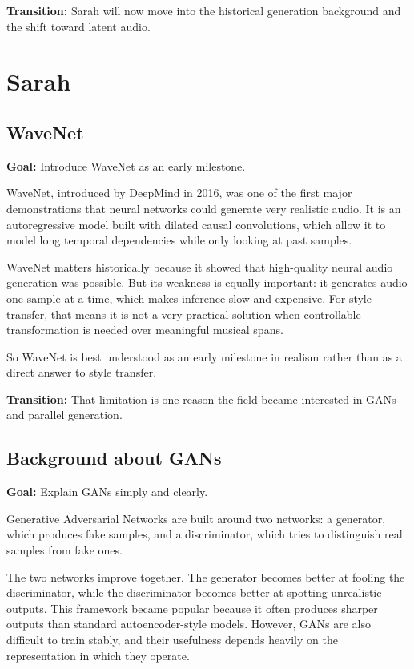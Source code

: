 \documentclass[11pt]{article}
\begin{document}
\textbf{Transition:} Sarah will now move into the historical generation background and the shift toward latent audio.

\newpage
\section{Sarah}

\subsection*{WaveNet}
\textbf{Goal:} Introduce WaveNet as an early milestone.

WaveNet, introduced by DeepMind in 2016, was one of the first major demonstrations that neural networks could generate very realistic audio. It is an autoregressive model built with dilated causal convolutions, which allow it to model long temporal dependencies while only looking at past samples.

WaveNet matters historically because it showed that high-quality neural audio generation was possible. But its weakness is equally important: it generates audio one sample at a time, which makes inference slow and expensive. For style transfer, that means it is not a very practical solution when controllable transformation is needed over meaningful musical spans.

So WaveNet is best understood as an early milestone in realism rather than as a direct answer to style transfer.

\textbf{Transition:} That limitation is one reason the field became interested in GANs and parallel generation.

\subsection*{Background about GANs}
\textbf{Goal:} Explain GANs simply and clearly.

Generative Adversarial Networks are built around two networks: a generator, which produces fake samples, and a discriminator, which tries to distinguish real samples from fake ones.

The two networks improve together. The generator becomes better at fooling the discriminator, while the discriminator becomes better at spotting unrealistic outputs. This framework became popular because it often produces sharper outputs than standard autoencoder-style models. However, GANs are also difficult to train stably, and their usefulness depends heavily on the representation in which they operate.
\end{document}
